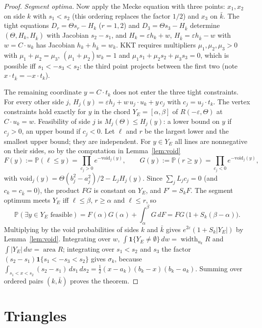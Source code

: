 \documentclass[11pt]{amsart}
\theoremstyle{remark}\newtheorem{remark}[theorem]{Remark}
\newcommand{\Prob}{\mathbb{P}}
\DeclareMathOperator{\area}{area}
\DeclareMathOperator{\width}{width}
\begin{document}
\begin{proof}
\emph{Segment optima.} Now apply the Mecke equation with three points: $x_1,x_2$ on side $k$ with $s_1<s_2$ (this
ordering replaces the factor $1/2$) and $x_3$ on $\bar k$. The tight equations $D_r=\Theta s_r-H_k$ ($r=1,2$) and
$D_3=\Theta s_3-H_{\bar k}$ determine $(\Theta,H_k,H_{\bar k})$ with Jacobian $s_2-s_1$, and
$H_k=\varepsilon h_k+w$, $H_{\bar k}=\varepsilon h_{\bar k}-w$ with $w=C\cdot u_k$ has Jacobian $h_k+h_{\bar
k}=w_k$. KKT requires multipliers $\mu_1,\mu_2,\mu_3>0$ with $\mu_1+\mu_2=\mu_3$, $(\mu_1+\mu_2)w_k=1$ and
$\mu_1s_1+\mu_2s_2+\mu_3s_3=0$, which is possible iff $s_1<-s_3<s_2$: the third point projects between the first two
(note $x\cdot t_{\bar k}=-x\cdot t_k$).

The remaining coordinate $y=C\cdot t_k$ does not enter the three tight constraints. For every other side $j$,
$H_j(y)=\varepsilon h_j+w\,u_j\cdot u_k+y\,c_j$ with $c_j=u_j\cdot t_k$. The vertex constraints hold exactly for $y$
in the chord $Y_E=[\alpha,\beta]$ of $R(-\varepsilon,\Theta)$ at $C\cdot u_k=w$. Feasibility of side $j$ is
$M_j(\Theta)\le H_j(y)$: a lower bound on $y$ if $c_j>0$, an upper bound if $c_j<0$. Let $\ell$ and $r$ be the largest
lower and the smallest upper bound; they are independent. For $y\in Y_E$ all lines are nonnegative on their sides, so
by the computation in Lemma~\ref{lem:void}
\[
F(y):=\Prob(\ell\le y)=\prod_{c_j>0}e^{-\mathrm{void}_j(y)},\qquad G(y):=\Prob(r\ge y)=\prod_{c_j<0}e^{-\mathrm{void}_j(y)},
\]
with $\mathrm{void}_j(y)=\Theta(b_j^2-a_j^2)/2-L_jH_j(y)$. Since $\sum_jL_jc_j=0$ (and $c_k=c_{\bar k}=0$), the product
$FG$ is constant on $Y_E$, and $F'=S_kF$. The segment optimum meets $Y_E$ iff $\ell\le\beta$, $r\ge\alpha$ and
$\ell\le r$, so
\[
\Prob(\exists y\in Y_E\text{ feasible})=F(\alpha)G(\alpha)+\int_\alpha^\beta G\,dF=F G\,\big(1+S_k(\beta-\alpha)\big).
\]
Multiplying by the void probabilities of sides $k$ and $\bar k$ gives $e^{2\varepsilon}(1+S_k|Y_E|)$ by
Lemma~\ref{lem:void}. Integrating over $w$, $\int\mathbf 1\{Y_E\ne\emptyset\}\,dw=\width_{u_k}R$ and
$\int|Y_E|\,dw=\area R$; integrating over $s_1<s_2$ and $s_3$ the factor $(s_2-s_1)\mathbf 1\{s_1<-s_3<s_2\}$ gives
$\sigma_k$, because $\int_{s_1<x<s_2}(s_2-s_1)\,ds_1\,ds_2=\frac12(x-a_k)(b_k-x)(b_k-a_k)$. Summing over ordered
pairs $(k,\bar k)$ proves the theorem.
\end{proof}

\section{Triangles}\label{sec:tri}
\end{document}
